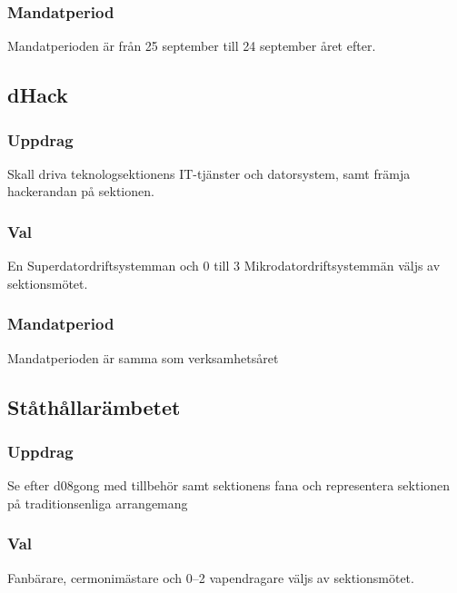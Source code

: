 \subsubsection{Mandatperiod}
Mandatperioden är från 25 september till 24 september året efter.


\subsection{dHack}
\subsubsection{Uppdrag}
Skall driva teknologsektionens IT-tjänster och datorsystem, samt
främja hackerandan på sektionen.
\subsubsection{Val}
En Superdatordriftsystemman och 0 till 3 Mikrodatordriftsystemmän väljs av sektionsmötet.
\subsubsection{Mandatperiod}
Mandatperioden är samma som verksamhetsåret

\subsection{Ståthållarämbetet}
\subsubsection{Uppdrag}
Se efter d08gong med tillbehör samt sektionens fana och representera sektionen på traditionsenliga arrangemang
\subsubsection{Val}
Fanbärare, cermonimästare och 0--2 vapendragare väljs av sektionsmötet.
